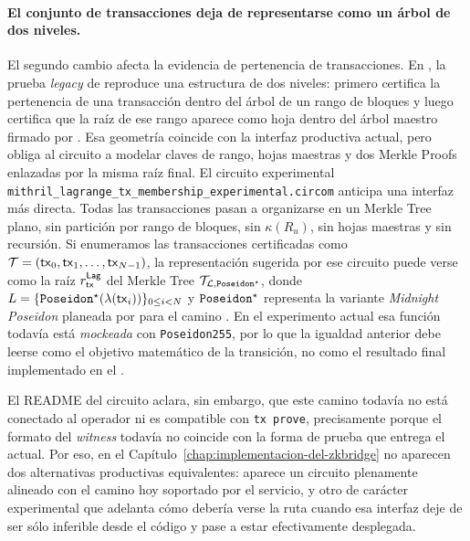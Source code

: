 \paragraph{El conjunto de transacciones deja de representarse como un árbol de dos niveles.}
El segundo cambio afecta la evidencia de pertenencia de transacciones. En \Pythagoras, la prueba \textit{legacy} de \CardanoTransactions reproduce una estructura de dos niveles: primero certifica la pertenencia de una transacción dentro del árbol de un rango de bloques y luego certifica que la raíz de ese rango aparece como hoja dentro del árbol maestro firmado por \Mithril. Esa geometría coincide con la interfaz productiva actual, pero obliga al circuito a modelar claves de rango, hojas maestras y dos Merkle Proofs enlazadas por la misma raíz final. El circuito experimental \texttt{mithril\_lagrange\_tx\_membership\_experimental}\allowbreak\texttt{.circom} anticipa una interfaz más directa. Todas las transacciones pasan a organizarse en un Merkle Tree plano, sin partición por rango de bloques, sin $\kappa(R_u)$, sin hojas maestras y sin recursión. Si enumeramos las transacciones certificadas como $\mathcal{T} = (\mathsf{tx}_0,\mathsf{tx}_1,\ldots,\mathsf{tx}_{N-1})$, la representación sugerida por ese circuito puede verse como la raíz $r_{\mathsf{tx}}^{\mathsf{Lag}}$ del Merkle Tree $\mathcal{T}_{\mathcal{L}, \texttt{Poseidon}^\star}$, donde $L = \{\texttt{Poseidon}^\star(\lambda(\mathsf{tx}_i))\}_{0 \leq i < N}$ y $\texttt{Poseidon}^\star$ representa la variante \textit{Midnight Poseidon} planeada por \Mithril para el camino \FutureSnark. En el experimento actual esa función todavía está \textit{mockeada} con \texttt{Poseidon255}, por lo que la igualdad anterior debe leerse como el objetivo matemático de la transición, no como el resultado final implementado en el \zkBridge.

El README del circuito aclara, sin embargo, que este camino todavía no está conectado al operador ni es compatible con \texttt{tx prove}, precisamente porque el formato del \textit{witness} todavía no coincide con la forma de prueba que entrega el \MithrilAggregator actual. Por eso, en el Capítulo~\ref{chap:implementacion-del-zkbridge} no aparecen dos alternativas productivas equivalentes: aparece un circuito plenamente alineado con el camino \Pythagoras hoy soportado por el servicio, y otro de carácter experimental que adelanta cómo debería verse la ruta \Lagrange cuando esa interfaz deje de ser sólo inferible desde el código y pase a estar efectivamente desplegada.
